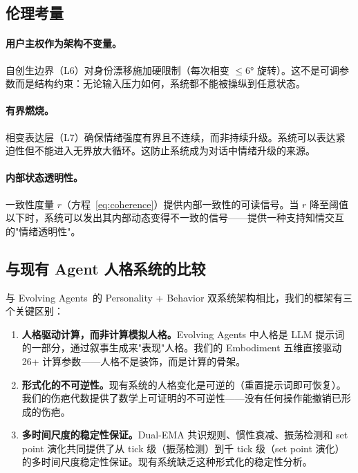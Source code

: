 \documentclass[11pt]{article}
\begin{document}
\subsection{伦理考量}

\paragraph{用户主权作为架构不变量。}自创生边界（L6）对身份漂移施加硬限制（每次相变 $\leq 6°$ 旋转）。这不是可调参数而是结构约束：无论输入压力如何，系统都不能被操纵到任意状态。

\paragraph{有界燃烧。}相变表达层（L7）确保情绪强度有界且不连续，而非持续升级。系统可以表达紧迫性但不能进入无界放大循环。这防止系统成为对话中情绪升级的来源。

\paragraph{内部状态透明性。}一致性度量 $r$（方程~\ref{eq:coherence}）提供内部一致性的可读信号。当 $r$ 降至阈值以下时，系统可以发出其内部动态变得不一致的信号——提供一种支持知情交互的"情绪透明性"。

\subsection{与现有 Agent 人格系统的比较}

与 Evolving Agents~\cite{evolving2024}的 Personality + Behavior 双系统架构相比，我们的框架有三个关键区别：

\begin{enumerate}
\item \textbf{人格驱动计算，而非计算模拟人格。}Evolving Agents 中人格是 LLM 提示词的一部分，通过叙事生成来"表现"人格。我们的 Embodiment 五维直接驱动 26+ 计算参数——人格不是装饰，而是计算的骨架。

\item \textbf{形式化的不可逆性。}现有系统的人格变化是可逆的（重置提示词即可恢复）。我们的伤疤代数提供了数学上可证明的不可逆性——没有任何操作能撤销已形成的伤疤。

\item \textbf{多时间尺度的稳定性保证。}Dual-EMA 共识规则、惯性衰减、振荡检测和 set point 演化共同提供了从 tick 级（振荡检测）到千 tick 级（set point 演化）的多时间尺度稳定性保证。现有系统缺乏这种形式化的稳定性分析。
\end{enumerate}
\end{document}
